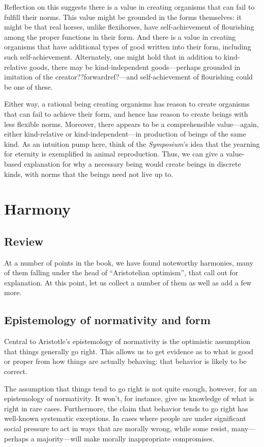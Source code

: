 Reflection on this suggests there is a value in creating organisms that can fail to fulfill their norms. This value might be
grounded in the forms themselves: it might be that real horses, unlike flexihorses, have self-achievement of flourishing among the
proper functions in their form. And there is a value in creating organisms that have additional types of good written into their
form, including such self-achievement. Alternately, one might hold that in addition to kind-relative goods, there may be
kind-independent goods---perhaps grounded in imitation of the creator??forwardref?---and self-achievement of flourishing
could be one of these.

Either way, a rational being creating organisms has reason to create organisms that can fail to achieve their form, and hence
has reason to create beings with less flexible norms. Moreover, there appears to be a comprehensible value---again, either 
kind-relative or kind-independent---in production of beings of the same kind. As an intuition pump here, think of the
\textit{Symposium}'s idea that the yearning for eternity is exemplified in animal reproduction. Thus, we can give a value-based
explanation for why a necessary being would create beings in discrete kinds, with norms that the beings need not live up to.

\section{Harmony}
\subsection{Review}
At a number of points in the book, we have found noteworthy harmonies, many of them falling under the head of ``Aristotelian optimism'', that call out for explanation. At this point, let us collect a number of them as well as add a few more.

\subsection{Epistemology of normativity and form}\label{ch:epist-of-form}
Central to Aristotle's epistemology of normativity is the optimistic assumption that things generally go right.
This allows us to get evidence as to what is good or proper from how things are actually behaving: that behavior 
is likely to be correct.

The assumption that things tend to go right is not quite enough, however, for an epistemology of normativity. 
It won't, for instance, give us knowledge of what is right in rare cases. Furthermore, the claim that behavior
tends to go right has well-known systematic exceptions. In cases where people are under significant social pressure
to act in ways that are morally wrong, while some resist, many---perhaps a majority---will make morally inappropriate
compromises. 

